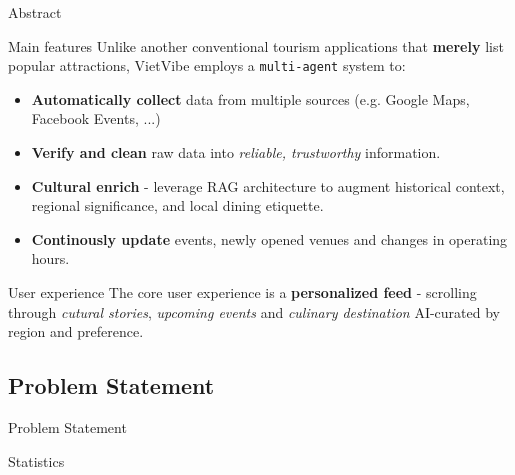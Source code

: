 \begin{frame}{Abstract}
    \begin{block}{Main features}
    Unlike another conventional tourism applications that \textbf{merely} list popular attractions, VietVibe employs a \texttt{multi-agent} system to:
    \begin{itemize}
        \item \textbf{Automatically collect} data from multiple sources (e.g. Google Maps, Facebook Events, ...)
        \item \textbf{Verify and clean} raw data into \textit{reliable, trustworthy} information.
        \item \textbf{Cultural enrich} - leverage RAG architecture to augment historical context, regional significance, and local dining etiquette.
        \item \textbf{Continously update} events, newly opened venues and changes in operating hours.
    \end{itemize}
    \end{block}

    \begin{block}{User experience}
    The core user experience is a \textbf{personalized feed} - scrolling through \textit{cutural stories}, \textit{upcoming events} and \textit{culinary destination} AI-curated by region and preference.
    \end{block}
\end{frame}

\subsection{Problem Statement}
\begin{frame}{Problem Statement}
    \begin{block}{Statistics}
    
    \end{block}
\end{frame}
